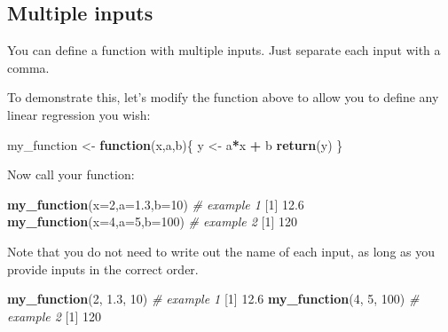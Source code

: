 \documentclass[]{book}
\newenvironment{Shaded}{\begin{snugshade}}{\end{snugshade}}
\newcommand{\CommentTok}[1]{\textcolor[rgb]{0.56,0.35,0.01}{\textit{#1}}}
\newcommand{\ControlFlowTok}[1]{\textcolor[rgb]{0.13,0.29,0.53}{\textbf{#1}}}
\newcommand{\DataTypeTok}[1]{\textcolor[rgb]{0.13,0.29,0.53}{#1}}
\newcommand{\DecValTok}[1]{\textcolor[rgb]{0.00,0.00,0.81}{#1}}
\newcommand{\FloatTok}[1]{\textcolor[rgb]{0.00,0.00,0.81}{#1}}
\newcommand{\KeywordTok}[1]{\textcolor[rgb]{0.13,0.29,0.53}{\textbf{#1}}}
\newcommand{\NormalTok}[1]{#1}
\newcommand{\OperatorTok}[1]{\textcolor[rgb]{0.81,0.36,0.00}{\textbf{#1}}}
\newcommand{\StringTok}[1]{\textcolor[rgb]{0.31,0.60,0.02}{#1}}
\begin{document}
\hypertarget{multiple-inputs}{%
\subsection*{Multiple inputs}\label{multiple-inputs}}

You can define a function with multiple inputs. Just separate each input with a comma.

To demonstrate this, let's modify the function above to allow you to define any linear regression you wish:

\begin{Shaded}
\begin{Highlighting}[]
\NormalTok{my_function <-}\StringTok{ }\ControlFlowTok{function}\NormalTok{(x,a,b)\{}
\NormalTok{  y <-}\StringTok{ }\NormalTok{a}\OperatorTok{*}\NormalTok{x }\OperatorTok{+}\StringTok{ }\NormalTok{b}
  \KeywordTok{return}\NormalTok{(y)}
\NormalTok{\}}
\end{Highlighting}
\end{Shaded}

Now call your function:

\begin{Shaded}
\begin{Highlighting}[]
\KeywordTok{my_function}\NormalTok{(}\DataTypeTok{x=}\DecValTok{2}\NormalTok{,}\DataTypeTok{a=}\FloatTok{1.3}\NormalTok{,}\DataTypeTok{b=}\DecValTok{10}\NormalTok{) }\CommentTok{# example 1}
\NormalTok{[}\DecValTok{1}\NormalTok{] }\FloatTok{12.6}
\KeywordTok{my_function}\NormalTok{(}\DataTypeTok{x=}\DecValTok{4}\NormalTok{,}\DataTypeTok{a=}\DecValTok{5}\NormalTok{,}\DataTypeTok{b=}\DecValTok{100}\NormalTok{) }\CommentTok{# example 2}
\NormalTok{[}\DecValTok{1}\NormalTok{] }\DecValTok{120}
\end{Highlighting}
\end{Shaded}

Note that you do not need to write out the name of each input, as long as you provide inputs in the correct order.

\begin{Shaded}
\begin{Highlighting}[]
\KeywordTok{my_function}\NormalTok{(}\DecValTok{2}\NormalTok{, }\FloatTok{1.3}\NormalTok{, }\DecValTok{10}\NormalTok{) }\CommentTok{# example 1}
\NormalTok{[}\DecValTok{1}\NormalTok{] }\FloatTok{12.6}
\KeywordTok{my_function}\NormalTok{(}\DecValTok{4}\NormalTok{, }\DecValTok{5}\NormalTok{, }\DecValTok{100}\NormalTok{) }\CommentTok{# example 2}
\NormalTok{[}\DecValTok{1}\NormalTok{] }\DecValTok{120}
\end{Highlighting}
\end{Shaded}
\end{document}
